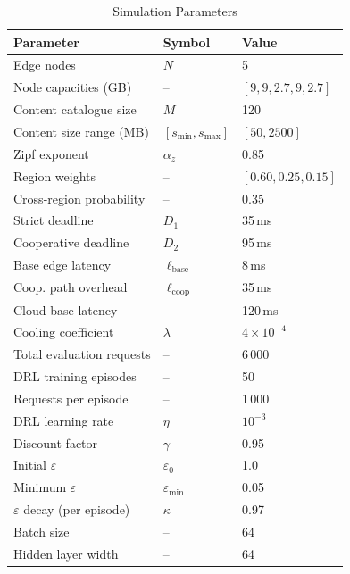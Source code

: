 \documentclass[conference]{IEEEtran}
\begin{document}
\begin{table}[t]
  \caption{Simulation Parameters}
  \label{tab:params}
  \renewcommand{\arraystretch}{1.2}
  \begin{tabular}{lll}
    \toprule
    \textbf{Parameter} & \textbf{Symbol} & \textbf{Value} \\
    \midrule
    Edge nodes                  & $N$          & 5 \\
    Node capacities (GB)        & --           & $[9,9,2.7,9,2.7]$ \\
    Content catalogue size      & $M$          & 120 \\
    Content size range (MB)     & $[s_{\min}, s_{\max}]$ & $[50, 2500]$ \\
    Zipf exponent               & $\alpha_z$   & 0.85 \\
    Region weights              & --           & $[0.60, 0.25, 0.15]$ \\
    Cross-region probability    & --           & 0.35 \\
    Strict deadline             & $D_1$        & 35\,ms \\
    Cooperative deadline        & $D_2$        & 95\,ms \\
    Base edge latency           & $\ell_{\mathrm{base}}$ & 8\,ms \\
    Coop. path overhead         & $\ell_{\mathrm{coop}}$ & 35\,ms \\
    Cloud base latency          & --           & 120\,ms \\
    Cooling coefficient         & $\lambda$    & $4 \times 10^{-4}$ \\
    Total evaluation requests   & --           & 6\,000 \\
    DRL training episodes       & --           & 50 \\
    Requests per episode        & --           & 1\,000 \\
    DRL learning rate           & $\eta$       & $10^{-3}$ \\
    Discount factor             & $\gamma$     & 0.95 \\
    Initial $\varepsilon$       & $\varepsilon_0$ & 1.0 \\
    Minimum $\varepsilon$       & $\varepsilon_{\min}$ & 0.05 \\
    $\varepsilon$ decay (per episode) & $\kappa$ & 0.97 \\
    Batch size                  & --           & 64 \\
    Hidden layer width          & --           & 64 \\
    \bottomrule
  \end{tabular}
\end{table}
\end{document}
